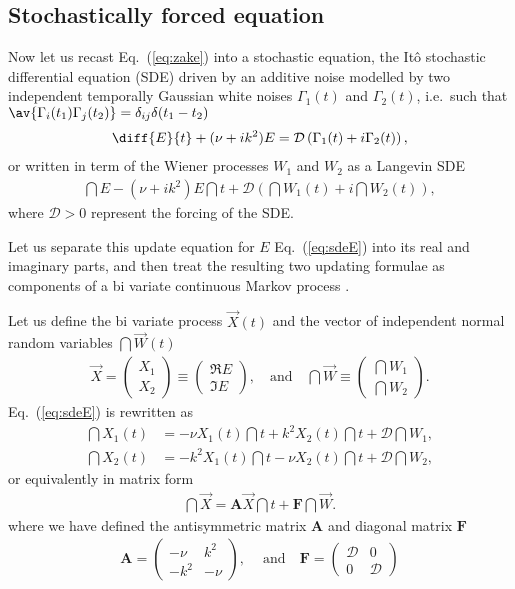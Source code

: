 \documentclass[10pt,a4paper]{article}
\newcommand{\eq}[1]{Eq.~(\ref{#1})}
\newcommand{\src}{\ensuremath{\mathcal{D}}}
\newcommand{\SDE}{\renewcommand{\SDE}{SDE\xspace}stochastic differential equation
(SDE)\xspace}
\begin{document}
\subsection{Stochastically forced equation}
Now let us recast \eq{eq:zake} into a stochastic equation, the Itô \SDE 
driven by an additive noise modelled by two independent temporally 
Gaussian white noises $\Gamma_1(t)$ and $\Gamma_2(t)$,
i.e.\ such that $\av{\Gamma_i(t_1)\Gamma_j(t_2)}=\delta_{ij}\delta(t_1-t_2)$
\citep{farrell:1996,gillespie:1996c,oksendal:2000}
\begin{align}
\diff{E}{t}+(\nu+ik^2) E = \src\left(\Gamma_1(t) + i\Gamma_2(t)\right),
\label{eq:sdeE1} 
\end{align}
or written in term of the Wiener processes $W_1$ and $W_2$ as a Langevin
\SDE
\begin{align}
\dint{E}  -(\nu+ik^2)E\dint{t}+\src\left(\dint{W_1(t)}+i\dint{W_2(t)}\right),
\label{eq:sdeE}
\end{align}
where $\src>0$ represent the forcing of the \SDE. 

Let us separate this update equation for $E$ \eq{eq:sdeE} into
its real and imaginary parts, and then treat the resulting two updating
formulae as components of a bi variate continuous Markov process
\citep{gillespie:1996c}.

Let us define the bi variate process $\vec{X}(t)$ and the vector of
independent normal random variables $\dint{\vec{W}}(t)$
\begin{align}
\vec{X}=\begin{pmatrix}X_1\\X_2\end{pmatrix}
\equiv\begin{pmatrix}\Re{E}\\\Im{E}\end{pmatrix},\quad\text{and}\quad
\dint{\vec{W}}\equiv\begin{pmatrix}\dint{W_1}\\\dint{W_2}\end{pmatrix}.
\end{align}
\eq{eq:sdeE} is rewritten as
\begin{align}
\dint{X_1}(t) &= -\nu X_1(t)\dint{t} +k^2X_2(t)\dint{t} + \src\dint{W_1},
\label{eq:x1}\\
\dint{X_2}(t) &= -k^2 X_1(t)\dint{t} -\nu X_2(t)\dint{t} + \src\dint{W_2},
\label{eq:x2}
\end{align}
or equivalently in matrix form \citep{farrell:1996}
\begin{align}
\dint{\vec{X}}=\mathbf{A}\vec{X}\dint{t}+\mathbf{F}\dint{\vec{W}}.
\end{align}
where we have defined the antisymmetric matrix $\mathbf{A}$ and diagonal
matrix $\mathbf{F}$
\begin{align}
\mathbf{A}=\begin{pmatrix}{-}\nu&k^2\\{-}k^2&{-}\nu\end{pmatrix},\
\quad\text{and}\quad
\mathbf{F}=\begin{pmatrix}\src&0\\0&\src\end{pmatrix}
\end{align}
\end{document}
